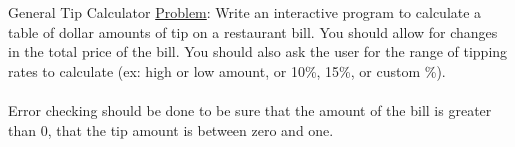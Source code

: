 \documentclass[graphics]{beamer}
\begin{document}
\begin{frame}{General Tip Calculator}
    \underline{Problem}:  Write an interactive program to calculate a table of dollar amounts of tip on a restaurant bill.  You should allow for changes in the total price of the bill. You should also ask the user for the range of tipping rates to calculate (ex: high or low amount, or 10\%, 15\%, or custom \%).
    \\ ~~ \\
    Error checking should be done to be sure that the amount of the bill is greater than 0, that the tip amount is between zero and one.
\end{frame}
%
\end{document}
